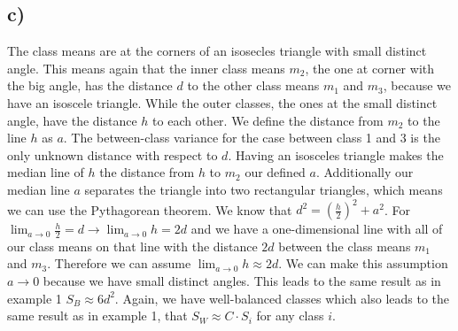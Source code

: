 \documentclass[paper=a4,fontsize=10pt,DIV11,BCOR10mm]{scrartcl}
\begin{document}
\subsection*{c)}
The class means are at the corners of an isosecles triangle with small distinct angle. This means again that the inner class means $m_2$, the one at corner with the big angle, has the distance $d$ to the other class means $m_1$ and $m_3$, because we have an isoscele triangle. While the outer classes, the ones at the small distinct angle, have the distance $h$ to each other. We define the distance from $m_2$ to the line $h$ as $a$. The between-class variance for the case between class 1 and 3 is the only unknown distance with respect to $d$. Having an isosceles triangle makes the median line of $h$ the distance from $h$ to $m_2$ our defined $a$. Additionally our median line $a$ separates the triangle into two rectangular triangles, which means we can use the Pythagorean theorem. We know that $ d^2 = (\frac{h}{2})^2 + a^2$. For $\lim_{a \to 0} \frac{h}{2} = d \rightarrow \lim_{a \to 0} h = 2d $ and we have a one-dimensional line with all of our class means on that line with the distance $2d$ between the class means $m_1$ and $m_3$. Therefore we can assume $\lim_{a \to 0}h \approx 2d$. We can make this assumption $a \to 0$ because we have small distinct angles. This leads to the same result as in example 1 $S_B \approx 6d^2$.
Again, we have well-balanced classes which also leads to the same result as in example 1, that $S_W \approx C \cdot S_i$ for any class $i$.

\end{document}
